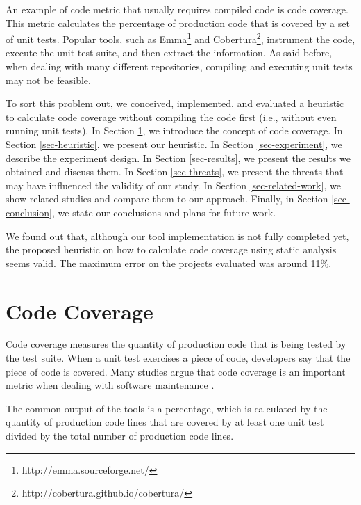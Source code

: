\documentclass{sig-alternate}
\begin{document}
An example of code metric that usually requires compiled code is code coverage. 
This metric calculates the percentage of production code that is covered 
by a set of unit tests. 
Popular tools, such as Emma\footnote{http://emma.sourceforge.net/} and
Cobertura\footnote{http://cobertura.github.io/cobertura/}, instrument the code, execute
the unit test suite, and then extract the information. As said before, when dealing
with many different repositories, compiling and executing unit tests may not be
feasible.

To sort this problem out, we conceived, implemented, and evaluated a 
heuristic to calculate code coverage without compiling the code first (i.e., 
without even running unit tests). In Section \ref{sec-code-coverage}, 
we introduce the concept of code coverage. In Section \ref{sec-heuristic}, 
we present our heuristic. In Section \ref{sec-experiment}, we describe the 
experiment design. In Section \ref{sec-results}, we present the results we 
obtained and discuss them. In Section \ref{sec-threats}, 
we present the threats that may have influenced the validity of our study. 
In Section \ref{sec-related-work}, we show related studies and compare them 
to our approach. Finally, in Section \ref{sec-conclusion}, we state our 
conclusions and plans for future work.

We found out that, although our tool implementation is not fully completed yet, the 
proposed heuristic on how to calculate code coverage using static analysis seems valid.
The maximum error on the projects evaluated was around 11\%.

\section{Code Coverage}
\label{sec-code-coverage}

Code coverage measures the quantity of production code that is being tested by
the test suite. When a unit test exercises a piece of code, developers say that the piece
of code is covered. 
Many studies argue that code coverage is an important
metric when dealing with software maintenance \cite{sebastian} \cite{del-frate} \cite{mei-hwa}.

The common output of the tools is a percentage, which is calculated
by the quantity of production code lines that are covered by at least one unit test divided by
the total number of production code lines.
\end{document}
